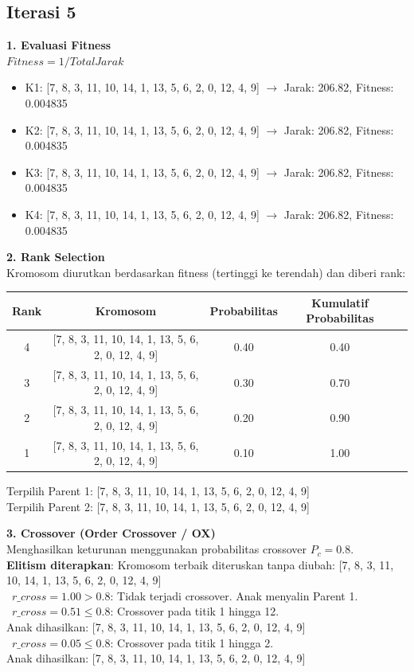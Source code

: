\documentclass[12pt]{article}
\begin{document}
\subsection*{Iterasi 5}
\textbf{1. Evaluasi Fitness}\\$Fitness = 1 / Total Jarak$
\begin{itemize}
\item K1: [7, 8, 3, 11, 10, 14, 1, 13, 5, 6, 2, 0, 12, 4, 9] $\rightarrow$ Jarak: 206.82, Fitness: 0.004835
\item K2: [7, 8, 3, 11, 10, 14, 1, 13, 5, 6, 2, 0, 12, 4, 9] $\rightarrow$ Jarak: 206.82, Fitness: 0.004835
\item K3: [7, 8, 3, 11, 10, 14, 1, 13, 5, 6, 2, 0, 12, 4, 9] $\rightarrow$ Jarak: 206.82, Fitness: 0.004835
\item K4: [7, 8, 3, 11, 10, 14, 1, 13, 5, 6, 2, 0, 12, 4, 9] $\rightarrow$ Jarak: 206.82, Fitness: 0.004835
\end{itemize}
\vspace{0.5cm}\textbf{2. Rank Selection}\\Kromosom diurutkan berdasarkan fitness (tertinggi ke terendah) dan diberi rank:
\begin{table}[h!]\centering\begin{tabular}{ccccc}\toprule Rank & Kromosom & Probabilitas & Kumulatif Probabilitas \\ \midrule
4 & [7, 8, 3, 11, 10, 14, 1, 13, 5, 6, 2, 0, 12, 4, 9] & 0.40 & 0.40 \\
3 & [7, 8, 3, 11, 10, 14, 1, 13, 5, 6, 2, 0, 12, 4, 9] & 0.30 & 0.70 \\
2 & [7, 8, 3, 11, 10, 14, 1, 13, 5, 6, 2, 0, 12, 4, 9] & 0.20 & 0.90 \\
1 & [7, 8, 3, 11, 10, 14, 1, 13, 5, 6, 2, 0, 12, 4, 9] & 0.10 & 1.00 \\
\bottomrule\end{tabular}\end{table}
Terpilih Parent 1: [7, 8, 3, 11, 10, 14, 1, 13, 5, 6, 2, 0, 12, 4, 9]\\
Terpilih Parent 2: [7, 8, 3, 11, 10, 14, 1, 13, 5, 6, 2, 0, 12, 4, 9]
\vspace{0.5cm}

\vspace{0.5cm}
\noindent\textbf{3. Crossover (Order Crossover / OX)}\\Menghasilkan keturunan menggunakan probabilitas crossover $P_c = 0.8$.\\
\textbf{Elitism diterapkan}: Kromosom terbaik diteruskan tanpa diubah: [7, 8, 3, 11, 10, 14, 1, 13, 5, 6, 2, 0, 12, 4, 9]\\
\textbullet\ $r\_cross = 1.00 > 0.8$: Tidak terjadi crossover. Anak menyalin Parent 1.\\
\textbullet\ $r\_cross = 0.51 \le 0.8$: Crossover pada titik 1 hingga 12.\\ Anak dihasilkan: [7, 8, 3, 11, 10, 14, 1, 13, 5, 6, 2, 0, 12, 4, 9]\\
\textbullet\ $r\_cross = 0.05 \le 0.8$: Crossover pada titik 1 hingga 2.\\ Anak dihasilkan: [7, 8, 3, 11, 10, 14, 1, 13, 5, 6, 2, 0, 12, 4, 9]\\
\end{document}
